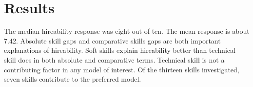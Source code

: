 \documentclass[review]{elsarticle}
\begin{document}



%

\section{Results}

The median hireability response was eight out of ten.
The mean response is about 7.42.
Absolute skill gaps and comparative skills gaps are both important explanations of hireability.
Soft skills explain hireability better than technical skill does in both absolute and comparative terms.
Technical skill is not a contributing factor in any model of interest.
Of the thirteen skills investigated, seven skills contribute to the preferred model.
\end{document}
